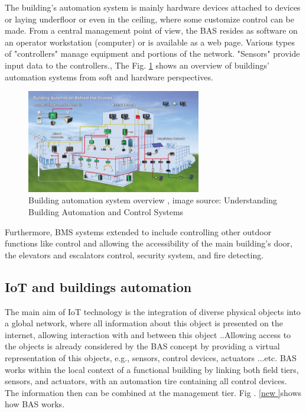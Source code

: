 \documentclass[conference]{IEEEtran}
\begin{document}
The building's automation system is mainly hardware devices attached to devices or laying underfloor or even in the ceiling, where some customize control can be made. From a central management point of view, the BAS resides as software on an operator workstation (computer) or is available as a web page. Various types of "controllers" manage equipment and portions of the network. "Sensors" provide input data to the controllers.\cite{control}, The Fig. \ref{BAS} shows an overview of buildings' automation systems from soft and hardware perspectives. 



\begin{figure}[h!]
	\centering
	\includegraphics[width=3in]{BAS.png}
	\caption{\label{BAS}  Building automation system overview
		, image source: Understanding Building Automation and Control Systems
		\cite{control} }
\end{figure}

Furthermore, BMS systems extended to include controlling other outdoor functions like control and allowing the accessibility of the main building's door, the elevators and escalators control, security system, and fire detecting. 
 
 \subsection{IoT and buildings automation }
 

 The main aim of IoT technology is the integration of diverse physical objects into a global network, where all information about this object is presented on the internet, allowing interaction with and between this object ..Allowing access to the objects is already considered by the BAS concept by providing a virtual representation of this objects, e.g., sensors, control devices, actuators ...etc. BAS works within the local context of a functional building by linking both field tiers, sensors, and actuators, with an automation tire containing all control devices. The information then can be combined at the management tier. Fig . \ref{new }shows how BAS works. 
\end{document}
